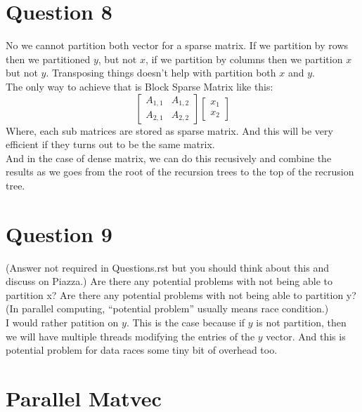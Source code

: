 \documentclass[]{article}
\begin{document}
\section*{Question 8}
    No we cannot partition both vector for a sparse matrix. If we partition by rows then we partitioned $y$, but not $x$, if we partition by columns then we partition $x$ but not $y$. Transposing things doesn't help with partition both $x$ and $y$. 
    \\
    The only way to achieve that is Block Sparse Matrix like this: 
    $$
        \begin{bmatrix}
            A_{1, 1} & A_{1, 2}
            \\
            A_{2, 1} & A_{2, 2}
        \end{bmatrix} \begin{bmatrix}
            x_1 \\ x_2
        \end{bmatrix}
    $$
    Where, each sub matrices are stored as sparse matrix. And this will be very efficient if they turns out to be the same matrix. 
    \\
    And in the case of dense matrix, we can do this recusively and combine the results as we goes from the root of the recursion trees to the top of the recrusion tree. 

\section*{Question 9}
    (Answer not required in Questions.rst but you should think about this and discuss on Piazza.) Are there any potential problems with not being able to partition x? Are there any potential problems with not being able to partition y? (In parallel computing, “potential problem” usually means race condition.)
    \\[1.1em]
    I would rather patition on $y$. This is the case because if $y$ is not partition, then we will have multiple threads modifying the entries of the $y$ vector. And this is potential problem for data races some tiny bit of overhead too. 
    


\section*{Parallel Matvec}
\end{document}
